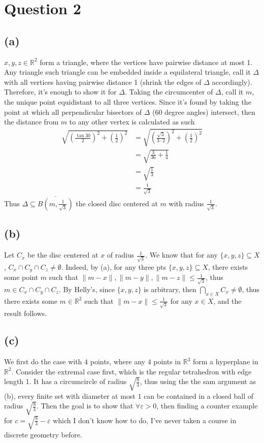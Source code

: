 \documentclass[a4paper,11pt]{article}
\begin{document}
\section*{Question 2}
\subsection*{(a)}
$x,y,z \in \mathbb{R}^2$ form a triangle, where the vertices have pairwise distance at most 1. Any triangle such triangle can be embedded inside a equilateral triangle, call it $\Delta$ with all vertices having pairwise distance 1 (shrink the edges of $\Delta$ accordingly). Therefore, it's enough to show  it for $\Delta$. Taking the circumcenter of $\Delta$, call it $m$, the unique point equidistant to all three vertices. Since it's found by taking the point at which all perpendicular bisectors of $\Delta$ (60 degree angles) intersect, then the distance from $m$ to any other vertex is calculated as such 
\begin{align*}
	\sqrt{\left(\frac{\tan 30}{2}\right)^2 + \left(\frac{1}{2}\right)^2} &= \sqrt{ \left(\frac{\sqrt{3}}{3\cdot 2}\right)^2 + \left(\frac{1}{2}\right)^2}\\
	&= \sqrt{\frac{3}{36} + \frac{1}{4}}\\
	&= \sqrt{\frac{1}{3}}\\
	&= \frac{1}{\sqrt{3}}
\end{align*}
Thus $\Delta \subseteq \overline{B(m,\frac{1}{\sqrt{3}})}$ the closed disc centered at $m$ with radius $\frac{1}{\sqrt{3}}$. 
\subsection*{(b)}
Let $C_x$ be the disc centered at $x$ of radius $\frac{1}{\sqrt{3}}$. We know that for any $\{x,y,z\} \subseteq X$, $C_x \cap C_y \cap C_z \neq \emptyset$. Indeed, by (a), for any three pts $\{x,y,z\} \subseteq X$, there exists some point $m$  such that $\|m-x\|, \|m-y\|, \|m-z\| \leq \frac{1}{\sqrt{3}}$, thus $m \in C_x \cap C_y \cap C_z$. By Helly's, since $\{x,y,z\}$ is arbitrary, then $\displaystyle \bigcap_{x \in X} C_x \neq \emptyset$, thus there exists some $m \in \mathbb{R}^2$ such that $\|m - x\| \leq \frac{1}{\sqrt{3}}$ for any $x \in X$, and the result follows. 
\subsection*{(c)}
We first do the case with $4$ points, where any $4$ points in $\mathbb{R}^3$ form a hyperplane in $\mathbb{R}^2$. Consider the extremal case first, which is the regular tetrahedron with edge length 1. It has a circumcircle of radius $\sqrt{\frac{8}{3}}$, thus using the the sam argument as (b), every finite set with diameter at most $1$ can be contained in a closed ball of radius $\sqrt{\frac{8}{3}}$. Then the goal is to show that $\forall \varepsilon > 0$, then finding a counter example for $c = \sqrt{\frac{8}{3}}-\varepsilon $ which I don't know how to do, I've never taken a course in discrete geometry before. 
\clearpage
\end{document}
